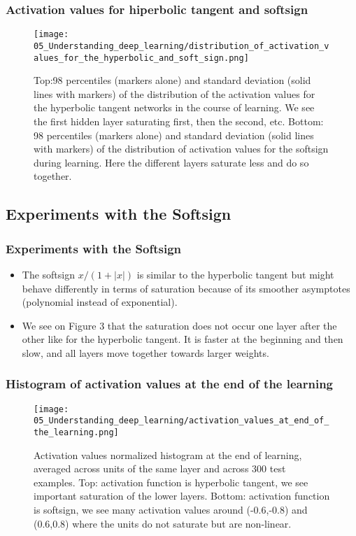 \begin{frame}
  \frametitle{Activation values for hiperbolic tangent and softsign}

  \begin{figure}[t]
    \centering
    \texttt{[image: 05\_Understanding\_deep\_learning/distribution\_of\_activation\_values\_for\_the\_hyperbolic\_and\_soft\_sign.png]}
    \caption{
      Top:98 percentiles (markers alone) and standard deviation (solid lines with markers) of the distribution of the activation values for the hyperbolic tangent networks in the course of learning. We see the first hidden layer saturating first, then the second, etc. Bottom: 98 percentiles (markers alone) and standard deviation (solid lines with markers) of the distribution of activation values for the softsign during learning. Here the different layers saturate less and do so together.
    }
  \end{figure}

\end{frame}

\subsection{Experiments with the Softsign}


\begin{frame}
  \frametitle{Experiments with the Softsign}

  \begin{itemize}
    \item The softsign $x/(1+|x|)$ is similar to the hyperbolic tangent but might behave differently in terms of saturation because of its smoother asymptotes (polynomial instead of exponential). 
    
    \item We see on Figure 3 that the saturation does not occur one layer after the other like for the hyperbolic tangent. It is faster at the beginning and then slow, and all layers move together towards larger weights.
  \end{itemize}

\end{frame}

\begin{frame}
  \frametitle{Histogram of activation values at the end of the learning}
\begin{figure}[t]
  \centering
  \texttt{[image: 05\_Understanding\_deep\_learning/activation\_values\_at\_end\_of\_the\_learning.png]}
  \caption{
    Activation values normalized histogram at the end of learning, averaged across units of the same layer and across 300 test examples. Top: activation function is hyperbolic tangent, we see important saturation of the lower layers. Bottom: activation function is softsign, we see many activation values around (-0.6,-0.8) and (0.6,0.8) where the units do not saturate but are non-linear.
  }
\end{figure}
  
\end{frame}

